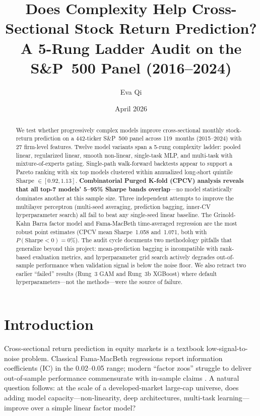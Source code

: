 \documentclass[11pt]{article}
\title{Does Complexity Help Cross-Sectional Stock Return Prediction? \\
       \large A 5-Rung Ladder Audit on the S\&P~500 Panel (2016--2024)}
\author{Eva Qi}
\date{April 2026}
\begin{document}
\maketitle

\begin{abstract}
\noindent
We test whether progressively complex models improve cross-sectional
monthly stock-return prediction on a 442-ticker S\&P~500 panel across
119~months (2015--2024) with 27 firm-level features. Twelve model
variants span a 5-rung complexity ladder: pooled linear, regularized
linear, smooth non-linear, single-task MLP, and multi-task with
mixture-of-experts gating. Single-path walk-forward backtests appear to
support a Pareto ranking with six top models clustered within annualized
long-short quintile Sharpe $\in[0.92, 1.13]$. \textbf{Combinatorial
Purged K-fold (CPCV) analysis reveals that all top-7 models' 5--95\%
Sharpe bands overlap}---no model statistically dominates another at this
sample size. Three independent attempts to improve the multilayer
perceptron (multi-seed averaging, prediction bagging, inner-CV
hyperparameter search) all fail to beat any single-seed linear baseline.
The Grinold-Kahn Barra factor model and Fama-MacBeth time-averaged
regression are the most robust point estimates (CPCV mean Sharpe~1.058
and~1.071, both with~$P(\text{Sharpe}<0)=0\%$). The audit cycle
documents two methodology pitfalls that generalize beyond this project:
mean-prediction bagging is incompatible with rank-based evaluation
metrics, and hyperparameter grid search actively degrades out-of-sample
performance when validation signal is below the noise floor. We also
retract two earlier ``failed'' results (Rung~3 GAM and Rung~3b
XGBoost) where default hyperparameters---not the methods---were the
source of failure.
\end{abstract}

\section{Introduction}\label{sec:intro}

Cross-sectional return prediction in equity markets is a textbook
low-signal-to-noise problem. Classical Fama-MacBeth regressions report
information coefficients (IC) in the 0.02--0.05 range; modern
``factor zoos'' struggle to deliver out-of-sample performance
commensurate with in-sample claims \citep{harvey_zoo, hou_replication}.
A natural question follows: at the scale of a developed-market large-cap
universe, does adding model capacity---non-linearity, deep architectures,
multi-task learning---improve over a simple linear factor model?
\end{document}

